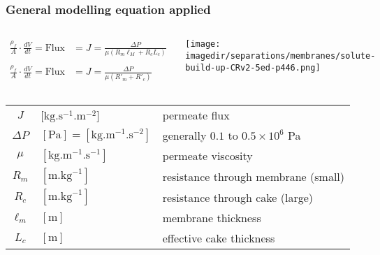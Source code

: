\begin{frame}\frametitle{General modelling equation applied}
	
	\begin{columns}[c]
			\[
				\begin{array}{rl}
					\displaystyle\frac{\rho_f}{A}\cdot\frac{dV}{dt} = \text{Flux} &= J = \displaystyle \frac{\Delta P}{\mu \left(R_m \ell_M + R_c L_c \right)} \\
					\\					
					\displaystyle\frac{\rho_f}{A}\cdot\frac{dV}{dt} = \text{Flux} &= J = \displaystyle \frac{\Delta P}{\mu \left(R'_m + R'_c \right)} 
				\end{array}
			\]
			\begin{center}
				\texttt{[image: \\imagedir/separations/membranes/solute-build-up-CRv2-5ed-p446.png]}
			\end{center}
	\end{columns}
	\vspace{-12pt}
	\begin{tabular}{cll}
		$J$			&	[$\text{kg}.\text{s}^{-1}\text{.m}^{-2}$] 				& permeate flux \\
		$\Delta P$	&	$[\text{Pa}] = [\text{kg}.\text{m}^{-1}\text{.s}^{-2}]$ & generally $0.1 \text{~to~} 0.5 \times 10^6$ Pa \\
		$\mu$ 		&  	$[\text{kg}.\text{m}^{-1}\text{.s}^{-1}]$				& permeate viscosity\\
		$R_m$ 		&  	$[\text{m}.\text{kg}^{-1}]$								& resistance through membrane (small)\\
		$R_c$ 		&  	$[\text{m}.\text{kg}^{-1}]$								& resistance through cake (large)\\
		$\ell_m$ 	&   $[\text{m}]$											& membrane thickness\\
		$L_c$ 		&   $[\text{m}]$											& effective cake thickness
	\end{tabular}
\end{frame}

